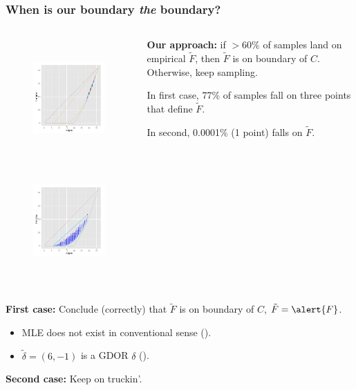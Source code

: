 \documentclass[ 10pt]{beamer}
\newcommand{\yobs}{y_{\text{obs}}}
\begin{document}
\frame
{
\frametitle{When is our boundary \emph{the} boundary?}  

\begin{columns}[]
\begin{column}[T]{0.4\textwidth}
\begin{figure}[h]
\centering
\includegraphics[height=1.8in, trim=3.5in 2in 0.in 0.0in, clip = true ]{MCsample-77face} %
\includegraphics[height=1.8in, trim=3.in 2in 0.15in 0.0in, clip = true ]{MCsample-interiorptonF}
\end{figure}
\end{column}

\begin{column}[t]{0.6\textwidth}

\pause 
\textbf{Our approach:} if $>60\%$ of samples land on empirical $\tilde{F}$, then $\tilde{F}$ is on boundary of $C$.  Otherwise, keep sampling.
\vspace{2mm}

\pause
In first case, 77\% of samples fall on three points that define $\tilde{F}$.  

In second, 0.0001\% (1 point) falls on $\tilde{F}$.
\end{column}
\end{columns}
\vspace{2mm}

\pause
\textbf{First case:} Conclude (correctly) that $\tilde{F}$ is on boundary of $C$, $\tilde{F} = \alert{F}$.
\begin{itemize}
\item MLE does not exist in conventional sense (\alert{\checkmark}).
\item $\tilde{\delta} = (6,-1)$ is a GDOR $\delta$ (\alert{\checkmark}).
\end{itemize}
\vspace{1mm}
\pause

\textbf{Second case:} Keep on truckin'.
}
%
\end{document}
